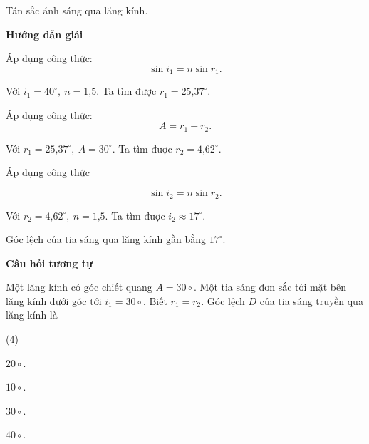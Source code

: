 \begin{dang}{Tán sắc ánh sáng qua lăng kính.}

	{	\begin{center}
			\textbf{Hướng dẫn giải}
		\end{center}
		
	Áp dụng công thức:
\begin{equation*}
	\sin i_1=n\sin r_1.
\end{equation*}

Với $i_1=40^\circ,\ n=\text{1,5} $. Ta tìm được $r_1=\text{25,37}^\circ$.

Áp dụng công thức:
\begin{equation*}
	A=r_1+r_2.
\end{equation*}

Với $r_1=\text{25,37}^\circ,\ A=30^\circ$. Ta tìm được $r_2=\text{4,62}^\circ$.

Áp dụng công thức

\begin{equation*}
	\sin i_2=n\sin r_2.
\end{equation*}

Với $r_2=\text{4,62}^\circ,\ n=\text{1,5} $. Ta tìm được $i_2\approx \text{17}^\circ$.

Góc lệch của tia sáng qua lăng kính gần bằng $\text{17}^\circ$.
		
	\begin{center}
	\textbf{Câu hỏi tương tự}
	\end{center}

Một lăng kính có góc chiết quang $ A = 30\circ $. Một tia sáng đơn sắc tới mặt bên lăng kính dưới góc tới $ i_{1} = 30\circ $. Biết $ r_{1} = r_{2} $. Góc lệch $ D $ của tia sáng truyền qua lăng kính là
\begin{mcq}(4)
	\item $ 20 \circ $.
	\item $ 10 \circ $.
	\item $ 30 \circ $.
	\item $ 40 \circ $.
\end{mcq}
	
}
\end{dang}
